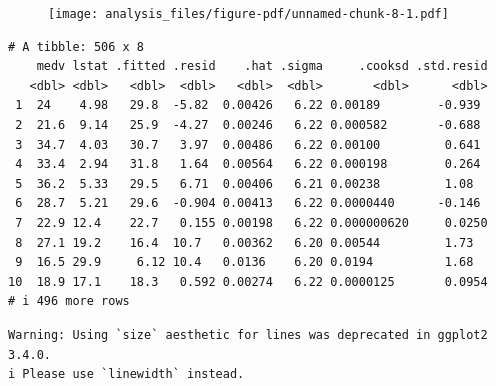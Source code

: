 \documentclass[
  letterpaper,
  DIV=11,
  numbers=noendperiod]{scrreprt}
\newenvironment{Shaded}{\begin{snugshade}}{\end{snugshade}}
\newcommand{\AttributeTok}[1]{\textcolor[rgb]{0.65,0.35,0.00}{#1}}
\newcommand{\DecValTok}[1]{\textcolor[rgb]{0.47,0.16,0.63}{#1}}
\newcommand{\FloatTok}[1]{\textcolor[rgb]{0.65,0.35,0.00}{#1}}
\newcommand{\FunctionTok}[1]{\textcolor[rgb]{0.02,0.16,0.49}{#1}}
\newcommand{\NormalTok}[1]{\textcolor[rgb]{0.33,0.33,0.33}{#1}}
\newcommand{\SpecialCharTok}[1]{\textcolor[rgb]{0.00,0.46,0.62}{#1}}
\begin{document}
\begin{figure}[H]

{\centering \texttt{[image: analysis\_files/figure-pdf/unnamed-chunk-8-1.pdf]}

}

\end{figure}

\begin{Shaded}
\end{Shaded}

\begin{verbatim}
# A tibble: 506 x 8
    medv lstat .fitted .resid    .hat .sigma     .cooksd .std.resid
   <dbl> <dbl>   <dbl>  <dbl>   <dbl>  <dbl>       <dbl>      <dbl>
 1  24    4.98   29.8  -5.82  0.00426   6.22 0.00189        -0.939 
 2  21.6  9.14   25.9  -4.27  0.00246   6.22 0.000582       -0.688 
 3  34.7  4.03   30.7   3.97  0.00486   6.22 0.00100         0.641 
 4  33.4  2.94   31.8   1.64  0.00564   6.22 0.000198        0.264 
 5  36.2  5.33   29.5   6.71  0.00406   6.21 0.00238         1.08  
 6  28.7  5.21   29.6  -0.904 0.00413   6.22 0.0000440      -0.146 
 7  22.9 12.4    22.7   0.155 0.00198   6.22 0.000000620     0.0250
 8  27.1 19.2    16.4  10.7   0.00362   6.20 0.00544         1.73  
 9  16.5 29.9     6.12 10.4   0.0136    6.20 0.0194          1.68  
10  18.9 17.1    18.3   0.592 0.00274   6.22 0.0000125       0.0954
# i 496 more rows
\end{verbatim}

\begin{verbatim}
Warning: Using `size` aesthetic for lines was deprecated in ggplot2 3.4.0.
i Please use `linewidth` instead.
\end{verbatim}
\end{document}
